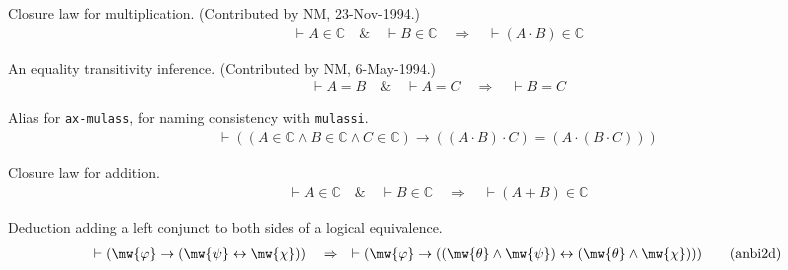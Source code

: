 \begin{lemma} Closure law for multiplication. 
(Contributed by NM, 23-Nov-1994.)
\begin{align}
\vdash A \in \mathbb{C}\quad\&\quad \vdash B \in
    \mathbb{C}\quad\Rightarrow\quad \vdash ( A \cdot B ) \in
    \mathbb{C}\label{eq:mulcli}\tag{mulcli}
\end{align}
\end{lemma}


\begin{lemma} An equality transitivity inference. 
(Contributed by NM, 6-May-1994.)
\begin{align}
\vdash A = B\quad\&\quad \vdash A = C\quad\Rightarrow\quad \vdash B =
    C\label{eq:eqtr3i}\tag{eqtr3i}
\end{align}
\end{lemma}


\begin{lemma} Alias for {\tt ax-mulass}, for naming
consistency with {\tt mulassi}.
\begin{align}
\vdash ( ( A \in \mathbb{C} \wedge B \in \mathbb{C} \wedge C \in \mathbb{C} )
    \rightarrow ( ( A \cdot B ) \cdot C ) = ( A \cdot ( B \cdot C ) )
    )\label{eq:mulass}\tag{mulass}
\end{align}
\end{lemma}


\begin{lemma} Closure law for addition.  
\begin{align}
\vdash A \in \mathbb{C}\quad\&\quad \vdash B \in
    \mathbb{C}\quad\Rightarrow\quad \vdash ( A + B ) \in
    \mathbb{C}\label{eq:addcli}\tag{addcli}
\end{align}
\end{lemma}


\begin{lemma} Deduction adding a left conjunct to both
sides of a logical equivalence.
\begin{align}
\vdash ( \mw{\varphi} \rightarrow ( \mw{\psi} \leftrightarrow \mw{\chi} )
    )\quad\Rightarrow\quad \vdash ( \mw{\varphi} \rightarrow ( ( \mw{\theta}
    \wedge \mw{\psi} ) \leftrightarrow ( \mw{\theta} \wedge \mw{\chi} ) )
    )\label{eq:anbi2d}\tag{anbi2d}
\end{align}
\end{lemma}


